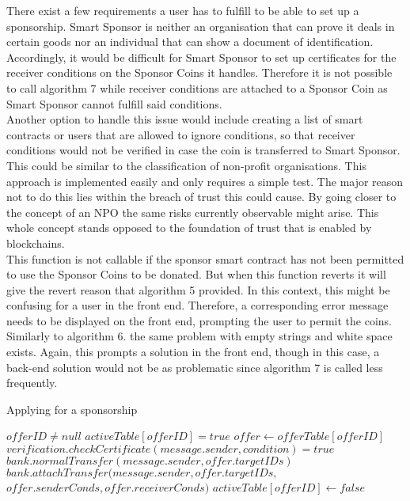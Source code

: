 There exist a few requirements a user has to fulfill to be able to set up a sponsorship. Smart Sponsor is neither an organisation that can prove it deals in certain goods nor an individual that can show a document of identification. Accordingly, it would be difficult for Smart Sponsor to set up certificates for the receiver conditions on the Sponsor Coins it handles. Therefore it is not possible to call algorithm 7 while receiver conditions are attached to a Sponsor Coin as Smart Sponsor cannot fulfill said conditions.\\
Another option to handle this issue would include creating a list of smart contracts or users that are allowed to ignore conditions, so that receiver conditions would not be verified in case the coin is transferred to Smart Sponsor. This could be similar to the classification of non-profit organisations. This approach is implemented easily and only requires a simple test. The major reason not to do this lies within the breach of trust this could cause. By going closer to the concept of an NPO the same risks currently observable might arise. This whole concept stands opposed to the foundation of trust that is enabled by blockchains.\\
This function is not callable if the sponsor smart contract has not been permitted to use the Sponsor Coins to be donated. But when this function reverts it will give the revert reason that algorithm 5 provided. In this context, this might be confusing for a user in the front end. Therefore, a corresponding error message needs to be displayed on the front end, prompting the user to permit the coins.\\
Similarly to algorithm 6. the same problem with empty strings and white space exists. Again, this prompts a solution in the front end, though in this case, a back-end solution would not be as problematic since algorithm 7 is called less frequently.
\begin{algorithm}
\caption{Applying for a sponsorship}\label{alg:applyOffer}
\begin{algorithmic}
\Require $offerID \neq null$
\Require $activeTable[offerID] = true$
\State $offer \gets offerTable[offerID]$
\Ensure $verification.checkCertificate(message.sender,condition) = true$
\EndFor
{}\\
\hspace{30pt}$bank.normalTransfer(message.sender, offer.targetIDs)$
\Else\\
\hspace{30pt}$bank.attachTransfer(message.sender, offer.targetIDs,$\\
\hspace{130pt}$offer.senderConds, offer.receiverConds)$
\EndIf
\State $activeTable[offerID] \gets false$
\end{algorithmic}
\end{algorithm}
